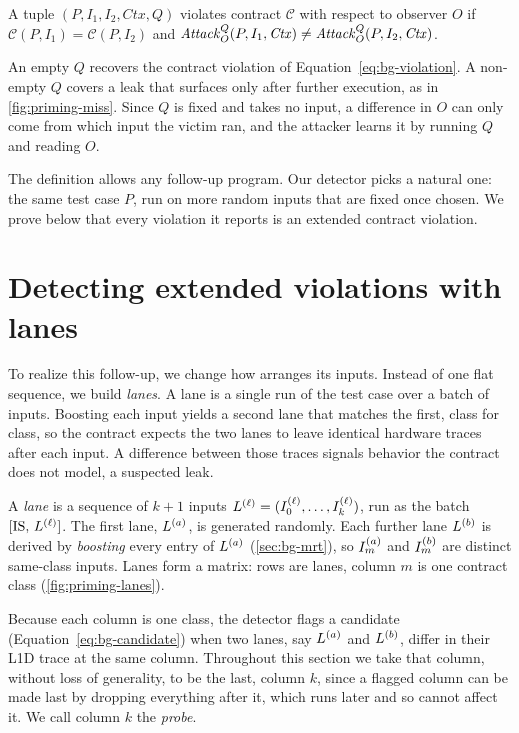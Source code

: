 \begin{definition}
\label{def:prime-extviolation}
A tuple $(P,I_1,I_2,\mathit{Ctx},Q)$ violates contract $\mathcal{C}$ with respect to observer $O$
if $\mathcal{C}(P,I_1)=\mathcal{C}(P,I_2)$ and
$\mathit{Attack}^{Q}_{O}(P,I_1,\mathit{Ctx})\neq\mathit{Attack}^{Q}_{O}(P,I_2,\mathit{Ctx})$.
\end{definition}

An empty $Q$ recovers the contract violation of Equation~\eqref{eq:bg-violation}. A non-empty $Q$
covers a leak that surfaces only after further execution, as in \autoref{fig:priming-miss}. Since
$Q$ is fixed and takes no input, a difference in $O$ can only come from which input the victim ran,
and the attacker learns it by running $Q$ and reading $O$.

The definition allows any follow-up program. Our detector picks a natural one: the same test case
$P$, run on more random inputs that are fixed once chosen. We prove below that every violation it
reports is an extended contract violation.

\section{Detecting extended violations with lanes}
\label{sec:priming-lanes}

To realize this follow-up, we change how \revizor{} arranges its inputs. Instead of one flat
sequence, we build \emph{lanes}. A lane is a single run of the test case over a batch of inputs.
Boosting each input yields a second lane that matches the first, class for class, so the contract
expects the two lanes to leave identical hardware traces after each input. A difference between those
traces signals behavior the contract does not model, a suspected leak.

\begin{definition}
\label{def:lane}
A \emph{lane} is a sequence of $k+1$ inputs $L^{(\ell)}=(I_{0}^{(\ell)},\dots,I_{k}^{(\ell)})$, run
as the batch $[\mathrm{IS},\,L^{(\ell)}]$. The first lane, $L^{(a)}$, is generated randomly. Each further
lane $L^{(b)}$ is derived by \emph{boosting} every entry of $L^{(a)}$ (\autoref{sec:bg-mrt}), so
$I_{m}^{(a)}$ and $I_{m}^{(b)}$ are distinct same-class inputs. Lanes form a matrix: rows are lanes,
column $m$ is one contract class (\autoref{fig:priming-lanes}).
\end{definition}

Because each column is one class, the detector flags a candidate
(Equation~\eqref{eq:bg-candidate}) when two lanes, say $L^{(a)}$ and $L^{(b)}$, differ in their
L1D trace at the same column. Throughout this section we take that column, without loss of
generality, to be the last, column $k$, since a flagged column can be made last by dropping
everything after it, which runs later and so cannot affect it. We call column $k$ the \emph{probe}.

